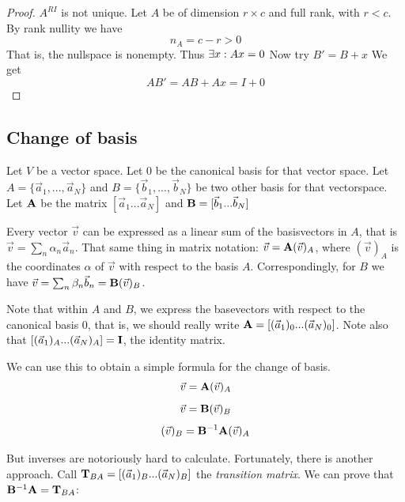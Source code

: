 \begin{proof}
    $A^{RI}$ is not unique.
    Let $A$ be of dimension $r \times c$ and full rank, with $r < c$. By rank nullity we have
    $$ n_A = c - r > 0 $$
    That is, the nullspace is nonempty. Thus $\exists x : Ax = 0$
    Now try $B' = B + x$
    We get 
    $$ AB' = AB + Ax = I + 0$$
\end{proof}












\subsection{Change of basis}\label{changeOfBasis}

Let $V$ be a vector space. Let $0$ be the canonical basis for that vector space. Let $A = \{\vec{a}_1, ..., \vec{a}_N \}$ and $B = \{\vec{b}_1, ..., \vec{b}_N\}$ be two other basis for that vectorspace. Let $\mathbf{A}$ be the matrix $[\vec{a}_1  ...  \vec{a}_N]$ and $\mathbf{B} = [\vec{b}_1 ... \vec{b}_N]$

Every vector $\vec{v}$ can be expressed as a linear sum of the basisvectors in $A$, that is $\vec{v} = \sum_n \alpha_n \vec{a}_n$. That same thing in matrix notation: $\vec{v} = \mathbf{A}(\vec{v})_A$, where $(\vec{v})_A$ is the coordinates $\alpha$ of $\vec{v}$ with respect to the basis $A$. Correspondingly, for $B$ we have $\vec{v} = \sum_n \beta_n \vec{b}_n = \mathbf{B}(\vec{v})_B$.

Note that within $A$ and $B$, we express the basevectors with respect to the canonical basis $0$, that is, we should really write $\mathbf{A} = [(\vec{a}_1)_0  ...  (\vec{a}_N)_0]$. Note also that $[(\vec{a}_1)_A  ...  (\vec{a}_N)_A] = \mathbf{I}$, the identity matrix. 

We can use this to obtain a simple formula for the change of basis. 
$$ \vec{v} = \mathbf{A} (\vec{v})_A $$
$$ \vec{v} = \mathbf{B} (\vec{v})_B $$
$$ (\vec{v})_B = \mathbf{B}^{-1} \mathbf{A} (\vec{v})_A $$

But inverses are notoriously hard to calculate. Fortunately, there is another approach. Call $\mathbf{T}_{BA} = [(\vec{a}_1)_B ... (\vec{a}_N)_B]$ the \emph{transition matrix}. We can prove that $\mathbf{B}^{-1} \mathbf{A} = \mathbf{T}_{BA}$:

